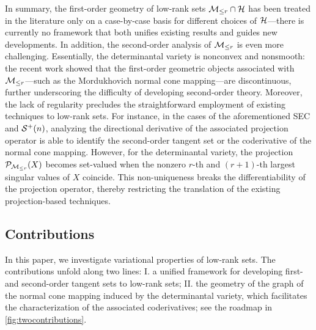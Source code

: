 \bigskip

In summary, the first-order geometry of low-rank sets $\mathcal{M}_{\le r} \cap \mathcal{H}$ has been treated in the literature only on a case-by-case basis for different choices of $\mathcal{H}$---there is currently no framework that both unifies existing results and guides new developments. In addition, the second-order analysis of $\mathcal{M}_{\le r}$ is even more challenging. Essentially, the determinantal variety is nonconvex and nonsmooth: the recent work \cite{olikier2022continuity} showed that the first-order geometric objects associated with $\mathcal{M}_{\le r}$---such as the Mordukhovich normal cone mapping---are discontinuous, further underscoring the difficulty of developing second-order theory. Moreover, the lack of regularity precludes the straightforward employment of existing techniques to low-rank sets. For instance, in the cases of the aforementioned SEC and $\mathcal{S}^+(n)$, analyzing the directional derivative of the associated projection operator is able to identify the second-order tangent set or the coderivative of the normal cone mapping. However, for the determinantal variety, the projection $\mathcal{P}_{\mathcal{M}_{\le r}}(X)$ becomes set-valued when the nonzero $r$-th and $(r+1)$-th largest singular values of $X$ coincide. This non-uniqueness breaks the differentiability of the projection operator, thereby restricting the translation of the existing projection-based techniques.



\subsection{Contributions}
In this paper, we investigate variational properties of low-rank sets. The contributions unfold along two lines: I. a unified framework for developing first- and second-order tangent sets to low-rank sets; II. the geometry of the graph of the normal cone mapping induced by the determinantal variety, which facilitates the characterization of the associated coderivatives; see the roadmap in \myfig\ref{fig:twocontributions}.


